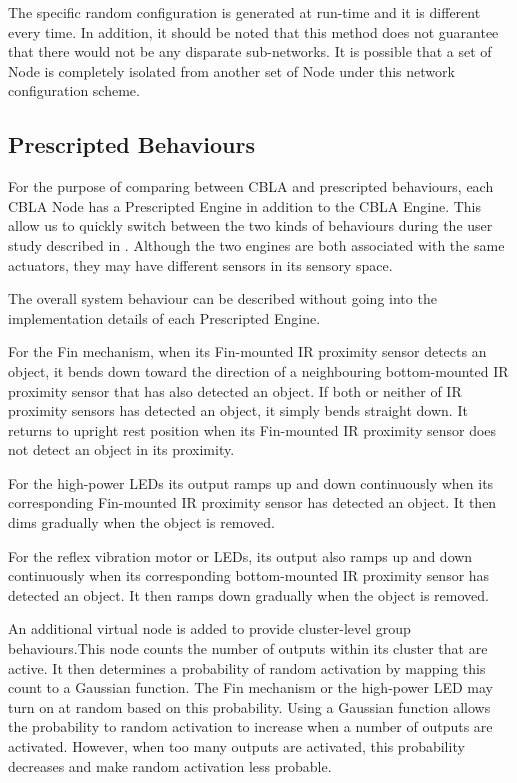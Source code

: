The specific random configuration is generated at run-time and it is different every time. In addition, it should be noted that this method does not guarantee that there would not be any disparate sub-networks. It is possible that a set of Node is completely isolated from another set of Node under this network configuration scheme.

\subsection{Prescripted Behaviours}

For the purpose of comparing between CBLA and prescripted behaviours, each CBLA Node has a Prescripted Engine in addition to the CBLA Engine. This allow us to quickly switch between the two kinds of behaviours during the user study described in . Although the two engines are both associated with the same actuators, they may have different sensors in its sensory space. 

The overall system behaviour can be described without going into the implementation details of each Prescripted Engine.

For the Fin mechanism, when its Fin-mounted IR proximity sensor detects an object, it bends down toward the direction of a neighbouring bottom-mounted IR proximity sensor that has also detected an object. If both or neither of IR proximity sensors has detected an object, it simply bends straight down. It returns to upright rest position when its Fin-mounted IR proximity sensor does not detect an object in its proximity.

For the high-power LEDs its output ramps up and down continuously when its corresponding Fin-mounted IR proximity sensor has detected an object. It then dims gradually when the object is removed.

For the reflex vibration motor or LEDs, its output also ramps up and down continuously when its corresponding bottom-mounted IR proximity sensor has detected an object. It then ramps down gradually when the object is removed.

An additional virtual node is added to provide cluster-level group behaviours.This node counts the number of outputs within its cluster that are active. It then determines a probability of random activation by mapping this count to a Gaussian function. The Fin mechanism or the high-power LED may turn on at random based on this probability. Using a Gaussian function allows the probability to random activation to increase when a number of outputs are activated. However, when too many outputs are activated, this probability decreases and make random activation less probable. 


